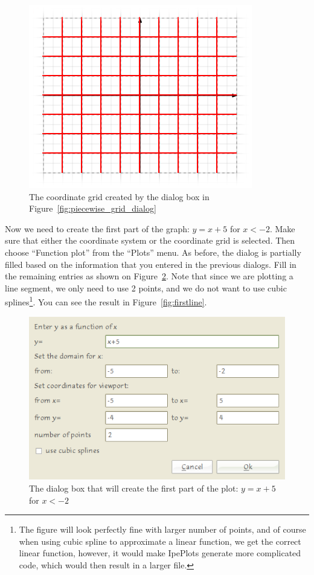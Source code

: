 \documentclass{article}
\begin{document}
\begin{figure}[h]
   \begin{center}
      \includegraphics[scale=2]{piecewise_grid.png}
   \end{center}
   \caption{The coordinate grid created by the dialog box in
   Figure~\ref{fig:piecewise_grid_dialog}}
   \label{fig:piecewise_grid}
\end{figure}

Now we need to create the first part of the graph: $y = x+5$ for $x < -2$. Make
sure that either the coordinate system or the coordinate grid is selected.
Then choose ``Function plot'' from the ``Plots'' menu. As before, the dialog is
partially filled based on the information that you entered in the previous
dialogs.  Fill in the remaining entries as shown on
Figure~\ref{fig:firstline_dialog}. Note that since we are plotting a line
segment, we only need to use 2 points, and we do not want to use cubic
splines\footnote{The figure will look perfectly fine with larger number of points, and of
course when using cubic spline to approximate a linear function, we get the
correct linear function, however, it would make IpePlots generate more
complicated code, which would then result in a larger file.}. You can see the result in
Figure~\ref{fig:firstline}.  

\begin{figure}[h]
   \begin{center}
      \includegraphics[scale=3]{firstline_dialog.png}
   \end{center}
   \caption{The dialog box that will create the first part of the plot: $y =
   x+5$ for $x < -2$}
   \label{fig:firstline_dialog}
\end{figure}
\end{document}
